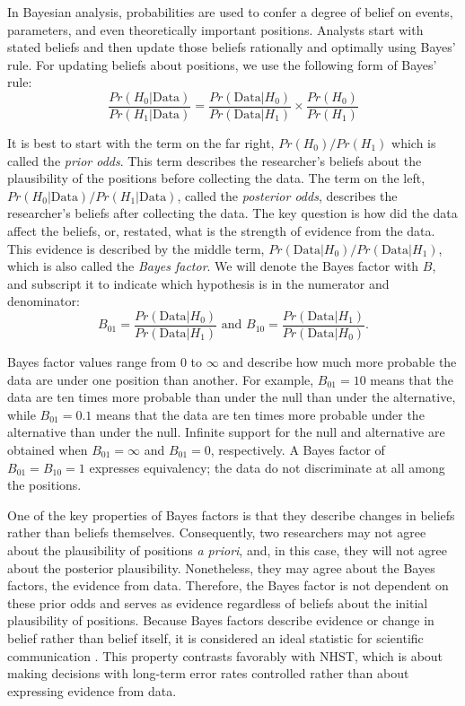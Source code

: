 \documentclass[man]{apa6}
\begin{document}
\nocite{Laplace:1986,Morey:Rouder:2014}

In Bayesian analysis, probabilities are used to confer a degree of belief on events, parameters, and even theoretically important positions.  Analysts start with stated beliefs and then update those beliefs rationally and optimally using Bayes' rule.  For updating beliefs about positions, we use the following form of Bayes' rule:
\begin{equation}
\frac{Pr(H_0 | \mbox{Data})}{Pr(H_1 | \mbox{Data})} = \frac{Pr(\mbox{Data} | H_0)}{Pr(\mbox{Data} | H_1)} \times \frac{Pr(H_0)}{Pr (H_1)} 
\end{equation}

It is best to start with the term on the far right, $Pr(H_0)/Pr(H_1)$ which is called the {\em prior odds}.  This term describes the researcher's beliefs about the plausibility of the positions before collecting the data.  The term on the left, $Pr(H_0 | \mbox{Data})/Pr(H_1 | \mbox{Data})$, called the {\em posterior odds}, describes the researcher's beliefs after collecting the data.   The key question is how did the data affect the beliefs, or, restated, what is the strength of evidence from the data.  This evidence is described by the middle term,  $Pr(\mbox{Data} | H_0)/Pr(\mbox{Data} | H_1)$, which is also called the {\em Bayes factor}.  We will denote the Bayes factor with $B$, and subscript it to indicate which hypothesis is in the numerator and denominator:
\[
B_{01} = \frac{Pr(\mbox{Data} | H_0)}{Pr(\mbox{Data} | H_1)} \mbox{ and } B_{10} = \frac{Pr(\mbox{Data} | H_1)}{Pr(\mbox{Data} | H_0)}.
\]

Bayes factor values range from 0 to $\infty$ and describe how much more probable the data are under one position than another.  For example, $B_{01}=10$ means that the data are ten times more probable than under the null than under the alternative, while $B_{01}=0.1$ means that the data are ten times more probable under the alternative than under the null.  Infinite support for the null and alternative are obtained when $B_{01}=\infty$ and $B_{01}=0$, respectively.  A Bayes factor of $B_{01}=B_{10}=1$ expresses equivalency; the data do not discriminate at all among the positions.

One of the key properties of Bayes factors is that they describe changes in beliefs rather than beliefs themselves.  Consequently, two researchers may not agree about the plausibility of positions {\em a priori}, and, in this case, they will not agree about the posterior plausibility.  Nonetheless, they may agree about the Bayes factors, the evidence from data.  Therefore, the Bayes factor is not dependent on these prior odds and serves as evidence regardless of beliefs about the initial plausibility of positions.  Because Bayes factors describe evidence or change in belief rather than belief itself, it is considered an ideal statistic for scientific communication \citep{Jeffreys:1961}.  This property contrasts favorably with NHST, which is about making decisions with long-term error rates controlled rather than about expressing evidence from data. 
\end{document}
